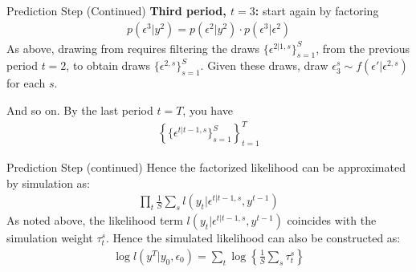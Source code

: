 \documentclass[xcolor=pdftex,dvipsnames,table,mathserif,aspectratio=169]{beamer}
\begin{document}
\begin{frame}{Prediction Step (Continued)}
\textbf{Third period, $t = 3$:} start again by factoring
\begin{eqnarray*}
p(\epsilon^3 | y^2) = p(\epsilon^2 | y^2) \cdot p(\epsilon^3 | \epsilon^2)
\end{eqnarray*}
As above, drawing from  requires filtering the draws $\{ \epsilon^{2|1,s}\}_{s=1}^S$, from the previous period $t = 2$, to obtain draws $\{ \epsilon^{2,s}\}_{s=1}^S$. Given these draws, draw $\epsilon_3^s \sim f(\epsilon' | \epsilon^{2,s})$ for each $s$.

And so on. By the last period $t = T$, you have
\begin{eqnarray*}
\left\{ \{ \epsilon^{t|t-1,s}\}_{s=1}^S \right\}_{t=1}^T
\end{eqnarray*}
\end{frame}

\begin{frame}{Prediction Step (continued)}
Hence the factorized likelihood can be approximated by simulation as:
\begin{eqnarray*}
\prod_t \frac{1}{S} \sum_s l (y_t | \epsilon^{t|t-1,s},y^{t-1})
\end{eqnarray*}
As noted above, the likelihood term $l(y_t | \epsilon^{t | t-1,s},y^{t-1})$ coincides with the simulation weight $\tau_t^s$. Hence the simulated likelihood can also be constructed as:
\begin{eqnarray*}
\log l (y^T | y_0, \epsilon_0) = \sum_t \log \left\{ \frac{1}{S} \sum_s \tau_t^s \right\}
\end{eqnarray*}
\end{frame}
\end{document}
